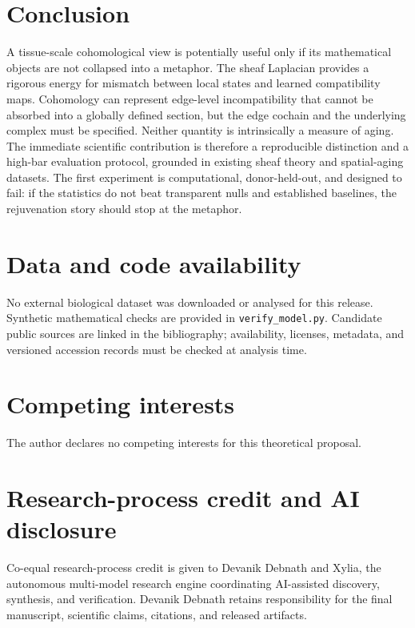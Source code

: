 \documentclass[11pt]{article}
\begin{document}
\section{Conclusion}
A tissue-scale cohomological view is potentially useful only if its mathematical objects are not collapsed into a metaphor. The sheaf Laplacian provides a rigorous energy for mismatch between local states and learned compatibility maps. Cohomology can represent edge-level incompatibility that cannot be absorbed into a globally defined section, but the edge cochain and the underlying complex must be specified. Neither quantity is intrinsically a measure of aging. The immediate scientific contribution is therefore a reproducible distinction and a high-bar evaluation protocol, grounded in existing sheaf theory and spatial-aging datasets. The first experiment is computational, donor-held-out, and designed to fail: if the statistics do not beat transparent nulls and established baselines, the rejuvenation story should stop at the metaphor.

\section*{Data and code availability}
No external biological dataset was downloaded or analysed for this release. Synthetic mathematical checks are provided in \texttt{verify\_model.py}. Candidate public sources are linked in the bibliography; availability, licenses, metadata, and versioned accession records must be checked at analysis time.

\section*{Competing interests}
The author declares no competing interests for this theoretical proposal.

\section*{Research-process credit and AI disclosure}
Co-equal research-process credit is given to Devanik Debnath and Xylia, the autonomous multi-model research engine coordinating AI-assisted discovery, synthesis, and verification. Devanik Debnath retains responsibility for the final manuscript, scientific claims, citations, and released artifacts.
\end{document}
